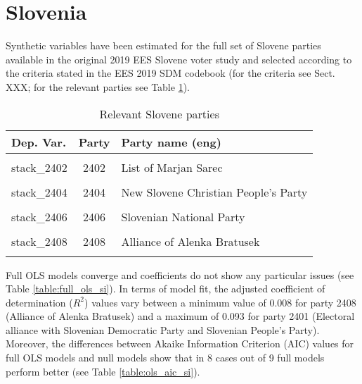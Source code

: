 \documentclass[
]{article}
\begin{document}
\clearpage

\newpage

\hypertarget{slovenia}{%
\section{Slovenia}\label{slovenia}}

Synthetic variables have been estimated for the full set of Slovene parties available in the original
2019 EES Slovene voter study and selected according to the criteria stated in the EES 2019 SDM codebook (for the criteria see Sect. XXX; for the relevant parties see Table \ref{table:relprty_tab_si}).

\begin{table}[!h]

\caption{\label{tab:unnamed-chunk-162}Relevant Slovene parties \label{table:relprty_tab_si}}
\centering
\begin{tabular}[t]{lcl}
\toprule
Dep. Var. & Party & Party name (eng)\\
\midrule
\cellcolor{gray!6}{stack\_2401} & \cellcolor{gray!6}{2401} & \cellcolor{gray!6}{Electoral alliance with Slovenian Democratic Party and Slovenian People's Party}\\
stack\_2402 & 2402 & List of Marjan Sarec\\
\cellcolor{gray!6}{stack\_2403} & \cellcolor{gray!6}{2403} & \cellcolor{gray!6}{Social Democratic Party}\\
stack\_2404 & 2404 & New Slovene Christian People's Party\\
\cellcolor{gray!6}{stack\_2405} & \cellcolor{gray!6}{2405} & \cellcolor{gray!6}{The Left}\\
\addlinespace
stack\_2406 & 2406 & Slovenian National Party\\
\cellcolor{gray!6}{stack\_2407} & \cellcolor{gray!6}{2407} & \cellcolor{gray!6}{Party of Miro Cerar}\\
stack\_2408 & 2408 & Alliance of Alenka Bratusek\\
\cellcolor{gray!6}{stack\_2409} & \cellcolor{gray!6}{2409} & \cellcolor{gray!6}{Democratic Party of Pensioners of Slovenia}\\
\bottomrule
\end{tabular}
\end{table}

Full OLS models converge and coefficients do not show any particular issues (see Table
\ref{table:full_ols_si}).
In terms of model fit, the adjusted coefficient of determination (\(R^2\)) values vary between
a minimum value of 0.008
for party 2408
(Alliance of Alenka Bratusek)
and a maximum of 0.093
for party 2401
(Electoral alliance with Slovenian Democratic Party and Slovenian People's Party).
Moreover, the differences between Akaike Information Criterion (AIC) values for full OLS models and null
models show that in 8 cases out of 9 full models perform better (see Table
\ref{table:ols_aic_si}).
\end{document}

